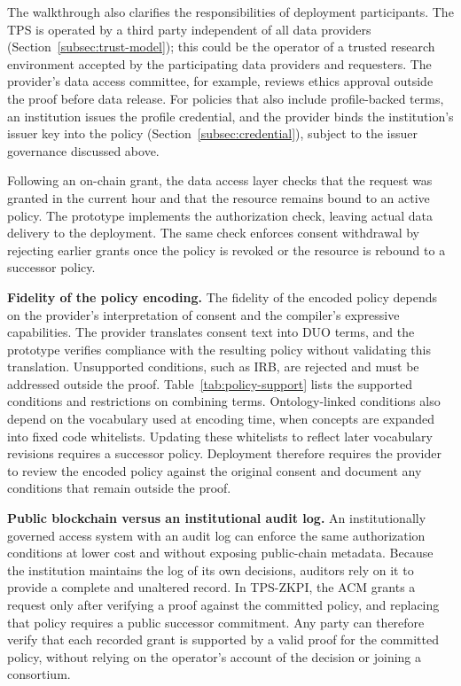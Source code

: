 

The walkthrough also clarifies the responsibilities of deployment participants.
The TPS is operated by a third party independent of all data providers (Section~\ref{subsec:trust-model}); this could be the operator of a trusted research environment accepted by the participating data providers and requesters.
The provider's data access committee, for example, reviews ethics approval outside the proof before data release.
For policies that also include profile-backed terms, an institution issues the profile credential, and the provider binds the institution's issuer key into the policy (Section~\ref{subsec:credential}), subject to the issuer governance discussed above.

Following an on-chain grant, the data access layer checks that the request was granted in the current hour and that the resource remains bound to an active policy.
The prototype implements the authorization check, leaving actual data delivery to the deployment.
The same check enforces consent withdrawal by rejecting earlier grants once the policy is revoked or the resource is rebound to a successor policy.

\textbf{Fidelity of the policy encoding.}
The fidelity of the encoded policy depends on the provider's interpretation of consent and the compiler's expressive capabilities.
The provider translates consent text into DUO terms, and the prototype verifies compliance with the resulting policy without validating this translation.
Unsupported conditions, such as IRB, are rejected and must be addressed outside the proof.
Table~\ref{tab:policy-support} lists the supported conditions and restrictions on combining terms.
Ontology-linked conditions also depend on the vocabulary used at encoding time, when concepts are expanded into fixed code whitelists.
Updating these whitelists to reflect later vocabulary revisions requires a successor policy.
Deployment therefore requires the provider to review the encoded policy against the original consent and document any conditions that remain outside the proof.

\textbf{Public blockchain versus an institutional audit log.}
An institutionally governed access system with an audit log can enforce the same authorization conditions at lower cost and without exposing public-chain metadata.
Because the institution maintains the log of its own decisions, auditors rely on it to provide a complete and unaltered record.
In TPS-ZKPI, the ACM grants a request only after verifying a proof against the committed policy, and replacing that policy requires a public successor commitment.
Any party can therefore verify that each recorded grant is supported by a valid proof for the committed policy, without relying on the operator's account of the decision or joining a consortium.


